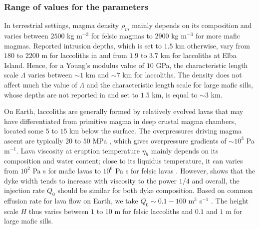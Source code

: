 \subsubsection*{Range of values for the parameters}

In terrestrial settings, magma density  $\rho_m$ mainly depends on its
composition and varies  between $ 2500$ kg m$^{-3}$  for felsic magmas
to  $2900$ kg  m$^{-3}$  for more  mafic  magmas.  Reported  intrusion
depths, which is set to $1.5$  km otherwise, vary from $180$ to $2200$
m for  laccoliths in \citet{E:2015tl} and  from $1.9$ to $3.7$  km for
laccoliths at Elba Island.  Hence, for a Young's modulus value of $10$
GPa, the characteristic length scale $\Lambda$ varies between $\sim 1$
km and $\sim  7$ km for laccoliths.  The density  does not affect much
the value of  $\Lambda$ and the characteristic length  scale for large
mafic sills,  whose depths are  not reported in  \citet{Cruden:tg} and
set to $1.5$ km, is equal to $\sim 3$ km.

On Earth, laccoliths are generally  formed by relatively evolved lavas
that  may have  differentiated from  primitive magma  in deep  crustal
magma chambers,  located some $5$  to $15$  km below the  surface. The
overpressures  driving magma  ascent are  typically $20$  to $50$  MPa
\citep{Stasiuk:1993kg,Barmin:2002ea},    which   gives    overpressure
gradients  of $\sim  10^3$ Pa  m$^{-1}$.  Lava  viscosity at  eruption
temperature  $\eta_h$  mainly depends  on  its  composition and  water
content; close to its liquidus  temperature, it can varies from $10^2$
Pa  s   for  mafic   lavas  to   $10^{6}$  Pa   s  for   felsic  lavas
\citep{Anonymous:CZVBrBvv,Giordano:2008em,Whittington:2009fv,Chevrel:2013jn}. However,
\citet{Wada:2007tv} shows that  the dyke width tends  to increase with
viscosity  to the  power  $1/4$ \citep{Kerr:1995tl}  and overall,  the
injection  rate $Q_0$  should be  similar for  both dyke  composition.
Based  on  common effusion  rate  for  lava  flow  on Earth,  we  take
$Q_0\sim              0.1-100$             m$^3$              s$^{-1}$
\citep{Pieri:1986bf,Harris:2000jd,Castro:2013jo,Tuffen:2013di}.    The
height  scale  $H$ thus  varies  between  $1$  to  $10$ m  for  felsic
laccoliths and $0.1$ and $1$ m for large mafic sills.

